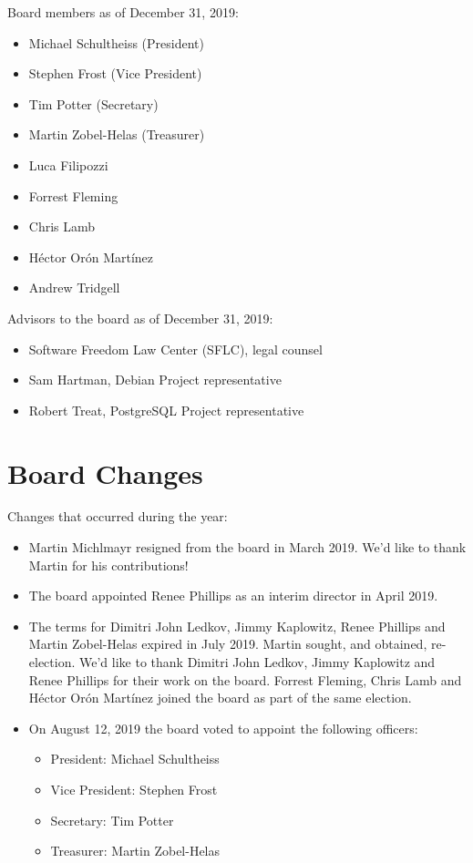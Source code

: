 \documentclass[a4paper]{report}
\begin{document}
Board members as of December 31, 2019:

\begin{itemize}
\item Michael Schultheiss (President)
\item Stephen Frost (Vice President)
\item Tim Potter (Secretary)
\item Martin Zobel-Helas (Treasurer)
\item Luca Filipozzi
\item Forrest Fleming
\item Chris Lamb
\item Héctor Orón Martínez
\item Andrew Tridgell
\end{itemize}

Advisors to the board as of December 31, 2019:

\begin{itemize}
\item Software Freedom Law Center (SFLC), legal counsel
\item Sam Hartman, Debian Project representative
\item Robert Treat, PostgreSQL Project representative
\end{itemize}

\section{Board Changes}

Changes that occurred during the year:

\begin{itemize}

\item Martin Michlmayr resigned from the board in March 2019.
We'd like to thank Martin for his contributions!

\item The board appointed Renee Phillips as an interim director in
April 2019.

\item The terms for Dimitri John Ledkov, Jimmy Kaplowitz, Renee Phillips
and Martin Zobel-Helas expired in July 2019.  Martin sought, and
obtained, re-election.  We'd like to thank Dimitri John Ledkov, Jimmy
Kaplowitz and Renee Phillips for their work on the board.  Forrest
Fleming, Chris Lamb and Héctor Orón Martínez joined the board as part
of the same election.

\item On August 12, 2019 the board voted to appoint the following
officers:

\begin{itemize}
\item President: Michael Schultheiss
\item Vice President: Stephen Frost
\item Secretary: Tim Potter
\item Treasurer: Martin Zobel-Helas
\end{itemize}

\end{itemize}
\end{document}
